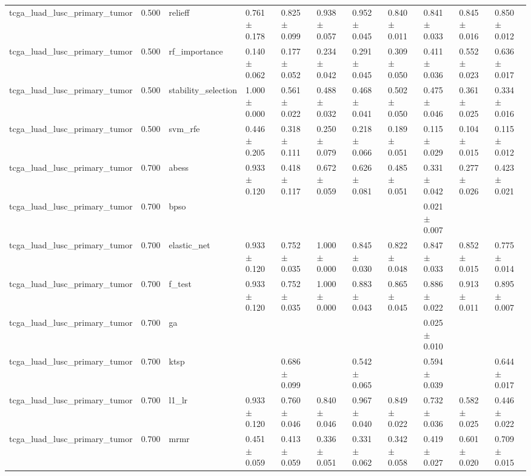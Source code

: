 \begin{table}[t]
\begin{tabular}{lllllllllll}
    tcga\_luad\_lusc\_primary\_tumor & 0.500 & relieff & 0.761 $\pm$ 0.178 & 0.825 $\pm$ 0.099 & 0.938 $\pm$ 0.057 & 0.952 $\pm$ 0.045 & 0.840 $\pm$ 0.011 & 0.841 $\pm$ 0.033 & 0.845 $\pm$ 0.016 & 0.850 $\pm$ 0.012 \\
    tcga\_luad\_lusc\_primary\_tumor & 0.500 & rf\_importance & 0.140 $\pm$ 0.062 & 0.177 $\pm$ 0.052 & 0.234 $\pm$ 0.042 & 0.291 $\pm$ 0.045 & 0.309 $\pm$ 0.050 & 0.411 $\pm$ 0.036 & 0.552 $\pm$ 0.023 & 0.636 $\pm$ 0.017 \\
    tcga\_luad\_lusc\_primary\_tumor & 0.500 & stability\_selection & 1.000 $\pm$ 0.000 & 0.561 $\pm$ 0.022 & 0.488 $\pm$ 0.032 & 0.468 $\pm$ 0.041 & 0.502 $\pm$ 0.050 & 0.475 $\pm$ 0.046 & 0.361 $\pm$ 0.025 & 0.334 $\pm$ 0.016 \\
    tcga\_luad\_lusc\_primary\_tumor & 0.500 & svm\_rfe & 0.446 $\pm$ 0.205 & 0.318 $\pm$ 0.111 & 0.250 $\pm$ 0.079 & 0.218 $\pm$ 0.066 & 0.189 $\pm$ 0.051 & 0.115 $\pm$ 0.029 & 0.104 $\pm$ 0.015 & 0.115 $\pm$ 0.012 \\
    tcga\_luad\_lusc\_primary\_tumor & 0.700 & abess & 0.933 $\pm$ 0.120 & 0.418 $\pm$ 0.117 & 0.672 $\pm$ 0.059 & 0.626 $\pm$ 0.081 & 0.485 $\pm$ 0.051 & 0.331 $\pm$ 0.042 & 0.277 $\pm$ 0.026 & 0.423 $\pm$ 0.021 \\
    tcga\_luad\_lusc\_primary\_tumor & 0.700 & bpso &  &  &  &  &  & 0.021 $\pm$ 0.007 &  &  \\
    tcga\_luad\_lusc\_primary\_tumor & 0.700 & elastic\_net & 0.933 $\pm$ 0.120 & 0.752 $\pm$ 0.035 & 1.000 $\pm$ 0.000 & 0.845 $\pm$ 0.030 & 0.822 $\pm$ 0.048 & 0.847 $\pm$ 0.033 & 0.852 $\pm$ 0.015 & 0.775 $\pm$ 0.014 \\
    tcga\_luad\_lusc\_primary\_tumor & 0.700 & f\_test & 0.933 $\pm$ 0.120 & 0.752 $\pm$ 0.035 & 1.000 $\pm$ 0.000 & 0.883 $\pm$ 0.043 & 0.865 $\pm$ 0.045 & 0.886 $\pm$ 0.022 & 0.913 $\pm$ 0.011 & 0.895 $\pm$ 0.007 \\
    tcga\_luad\_lusc\_primary\_tumor & 0.700 & ga &  &  &  &  &  & 0.025 $\pm$ 0.010 &  &  \\
    tcga\_luad\_lusc\_primary\_tumor & 0.700 & ktsp &  & 0.686 $\pm$ 0.099 &  & 0.542 $\pm$ 0.065 &  & 0.594 $\pm$ 0.039 &  & 0.644 $\pm$ 0.017 \\
    tcga\_luad\_lusc\_primary\_tumor & 0.700 & l1\_lr & 0.933 $\pm$ 0.120 & 0.760 $\pm$ 0.046 & 0.840 $\pm$ 0.046 & 0.967 $\pm$ 0.040 & 0.849 $\pm$ 0.022 & 0.732 $\pm$ 0.036 & 0.582 $\pm$ 0.025 & 0.446 $\pm$ 0.022 \\
    tcga\_luad\_lusc\_primary\_tumor & 0.700 & mrmr & 0.451 $\pm$ 0.059 & 0.413 $\pm$ 0.059 & 0.336 $\pm$ 0.051 & 0.331 $\pm$ 0.062 & 0.342 $\pm$ 0.058 & 0.419 $\pm$ 0.027 & 0.601 $\pm$ 0.020 & 0.709 $\pm$ 0.015 \\

\end{tabular}
\end{table}
